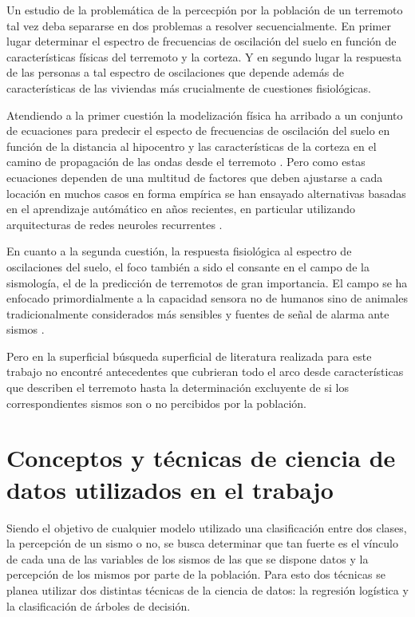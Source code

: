 \documentclass[a4paper]{report}
\begin{document}
Un estudio de la problemática de la percecpión por la población de un terremoto tal vez deba separarse en dos problemas a resolver secuencialmente.
En primer lugar determinar el espectro de frecuencias de oscilación del suelo en función de características físicas del terremoto y la corteza.
Y en segundo lugar la respuesta de las personas a tal espectro de oscilaciones que depende además de características de las viviendas más crucialmente de cuestiones fisiológicas.

Atendiendo a la primer cuestión la modelización física ha arribado a un conjunto de ecuaciones para predecir el especto de frecuencias de oscilación del suelo en función de la distancia al hipocentro y las características de la corteza en el camino de propagación de las ondas desde el terremoto \cite{lior_relation_2018}.
Pero como estas ecuaciones dependen de una multitud de factores que deben ajustarse a cada locación en muchos casos en forma empírica se han ensayado alternativas basadas en el aprendizaje autómático en años recientes, en particular utilizando arquitecturas de redes neuroles recurrentes \cite{datta_deepshake_2022}.

En cuanto a la segunda cuestión, la respuesta fisiológica al espectro de oscilaciones del suelo, el foco también a sido el consante en el campo de la sismología, el de la predicción de terremotos de gran importancia.
El campo se ha enfocado primordialmente a la capacidad sensora no de humanos sino de animales tradicionalmente considerados más sensibles y fuentes de señal de alarma ante sismos \cite{kirschvink_earthquake_2000}.

Pero en la superficial búsqueda superficial de literatura realizada para este trabajo no encontré antecedentes que cubrieran todo el arco desde características que describen el terremoto hasta la determinación excluyente de si los correspondientes sismos son o no percibidos por la población.


\section{Conceptos y técnicas de ciencia de datos utilizados en el trabajo}

Siendo el objetivo de cualquier modelo utilizado una clasificación entre dos clases, la percepción de un sismo o no, se busca determinar que tan fuerte es el vínculo de cada una de las variables de los sismos de las que se dispone datos y la percepción de los mismos por parte de la población.
Para esto dos técnicas se planea utilizar dos distintas técnicas de la ciencia de datos: la regresión logística y la clasificación de árboles de decisión. 
\end{document}
